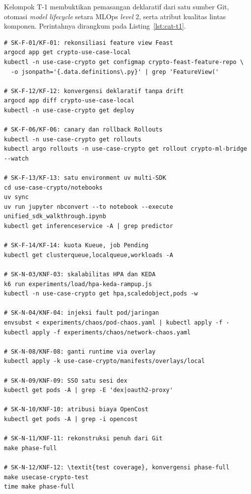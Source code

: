 Kelompok T-1 membuktikan pemasangan deklaratif dari satu sumber Git, otomasi \textit{model lifecycle} setara MLOps \textit{level} 2, serta atribut kualitas lintas komponen. Perintahnya dirangkum pada Listing~\ref{lst:cat-t1}.

\begin{lstlisting}[caption={Perintah verifikasi tujuan T-1 (dari \texttt{\textasciitilde/documents/ta/})},label={lst:cat-t1},basicstyle=\ttfamily\footnotesize,breaklines=true,captionpos=t]
# SK-F-01/KF-01: rekonsiliasi feature view Feast
argocd app get crypto-use-case-local
kubectl -n use-case-crypto get configmap crypto-feast-feature-repo \
  -o jsonpath='{.data.definitions\.py}' | grep 'FeatureView('

# SK-F-12/KF-12: konvergensi deklaratif tanpa drift
argocd app diff crypto-use-case-local
kubectl -n use-case-crypto get deploy

# SK-F-06/KF-06: canary dan rollback Rollouts
kubectl -n use-case-crypto get rollouts
kubectl argo rollouts -n use-case-crypto get rollout crypto-ml-bridge --watch

# SK-F-13/KF-13: satu environment uv multi-SDK
cd use-case-crypto/notebooks
uv sync
uv run jupyter nbconvert --to notebook --execute unified_sdk_walkthrough.ipynb
kubectl get inferenceservice -A | grep predictor

# SK-F-14/KF-14: kuota Kueue, job Pending
kubectl get clusterqueue,localqueue,workloads -A

# SK-N-03/KNF-03: skalabilitas HPA dan KEDA
k6 run experiments/load/hpa-keda-rampup.js
kubectl -n use-case-crypto get hpa,scaledobject,pods -w

# SK-N-04/KNF-04: injeksi fault pod/jaringan
envsubst < experiments/chaos/pod-chaos.yaml | kubectl apply -f -
kubectl apply -f experiments/chaos/network-chaos.yaml

# SK-N-08/KNF-08: ganti runtime via overlay
kubectl apply -k use-case-crypto/manifests/overlays/local

# SK-N-09/KNF-09: SSO satu sesi dex
kubectl get pods -A | grep -E 'dex|oauth2-proxy'

# SK-N-10/KNF-10: atribusi biaya OpenCost
kubectl get pods -A | grep -i opencost

# SK-N-11/KNF-11: rekonstruksi penuh dari Git
make phase-full

# SK-N-12/KNF-12: \textit{test coverage}, konvergensi phase-full
make usecase-crypto-test
time make phase-full
\end{lstlisting}

